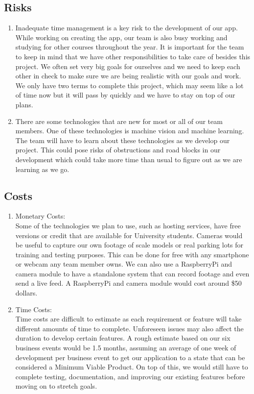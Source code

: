 \documentclass[12pt,letterpaper]{article}
\begin{document}
\subsection{Risks}
\begin{enumerate}
    \item Inadequate time management is a key risk to the development of our
    app. While working on creating the app, our team is also busy working and
    studying for other courses throughout the year. It is important for the team
    to keep in mind that we have other responsibilities to take care of besides
    this project. We often set very big goals for ourselves and we need to keep
    each other in check to make sure we are being realistic with our goals and
    work. We only have two terms to complete this project, which may seem like a
    lot of time now but it will pass by quickly and we have to stay on top of
    our plans.
    
    \item There are some technologies that are new for most or all of our team
    members. One of these technologies is machine vision and machine learning.
    The team will have to learn about these technologies as we develop our
    project. This could pose risks of obstructions and road blocks in our
    development which could take more time than usual to figure out as we are
    learning as we go.
\end{enumerate}

\subsection{Costs}
\begin{enumerate}
    \item Monetary Costs: \\
    Some of the technologies we plan to use, such as hosting services, have free
    versions or credit that are available for University students. Cameras would
    be useful to capture our own footage of scale models or real parking lots
    for training and testing purposes. This can be done for free with any
    smartphone or webcam any team member owns. We can also use a RaspberryPi and
    camera module to have a standalone system that can record footage and even
    send a live feed. A RaspberryPi and camera module would cost around \$50
    dollars.
    
    \item Time Costs: \\
    Time costs are difficult to estimate as each requirement or feature will
    take different amounts of time to complete. Unforeseen issues may also
    affect the duration to develop certain features. A rough estimate based on
    our six business events would be 1.5 months, assuming an average of one week
    of development per business event to get our application to a state that can
    be considered a Minimum Viable Product. On top of this, we would still have
    to complete testing, documentation, and improving our existing features
    before moving on to stretch goals. 
    
\end{enumerate}
\end{document}
